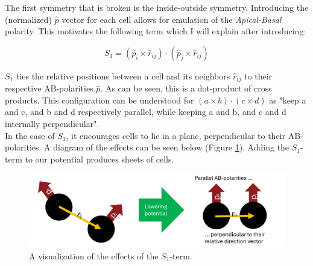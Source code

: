 The first symmetry that is broken is the inside-outside symmetry. Introducing the (normalized) $\hat{p}$ vector for each cell allows for emulation of the \textit{Apical-Basal} polarity.
This motivates the following term which I will explain after introducing:

\begin{equation*}
    S_1=\left(\hat{p}_i \times \hat{r}_{i j}\right) \cdot\left(\hat{p}_j \times \hat{r}_{i j}\right)
\end{equation*}

$S_1$ ties the relative positions between a cell and its neighbors $\hat{r}_{i j}$ to their respective AB-polarities $\hat{p}$.
As can be seen, this is a dot-product of cross products. This configuration can be understood for $\left(a \times b\right) \cdot\left(c \times d\right)$ as "keep a and c, and b and d respectively parallel, while keeping a and b, and c and d internally perpendicular". \\ 

In the case of $S_1$, it encourages cells to lie in a plane, perpendicular to their AB-polarities. A diagram of the effects can be seen below (Figure \ref{fig:explain-S1}). Adding the $S_1$-term to our potential produces sheets of cells. 


\begin{figure}[H]
    \centering
    \includegraphics[width=1\linewidth]{chapters//Theory//figures/explainS1.png}
    \caption{A visualization of the effects of the $S_1$-term.}
    \label{fig:explain-S1}
\end{figure}


